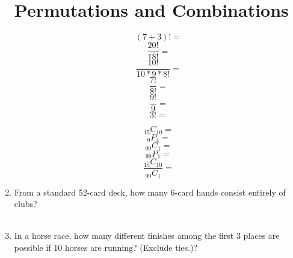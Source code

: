 \documentclass[14pt]{extarticle}
\begin{document}
\begin{enumerate}
\section{Permutations and Combinations}
	\begin{multicols}{3}
		$$(7+3)!=$$
		\vspace{0.5cm}
		$$\frac{20!}{18!}=$$
		\vspace{0.5cm}
		$$\frac{10!}{10*9*8!}=$$
		\vspace{0.5cm}
		$$\frac{7!}{8!}=$$
		\vspace{0.5cm}
		$$\frac{9!}{9}=$$
		\vspace{0.5cm}
		$$3!=$$
		\vspace{0.5cm}
	\end{multicols}
	\vspace{0.5cm}
	\begin{multicols}{3}
		$$_{15}C_{10}=$$
		\vspace{0.5cm}
		$$_9P_4=$$
		\vspace{0.5cm}
		$$_{99}C_1=$$
		\vspace{0.5cm}
		$$_{99}P_1=$$
		\vspace{0.5cm}
		$$\frac{_{15}C_{10}}{_{99}C_1}=$$
		\vspace{0.5cm}
	\end{multicols}
	\vspace{2cm}
	\item From a standard 52-card deck, how many 6-card hands consist entirely of clubs?
	\vspace{2cm}
	\\\\
	\item In a horse race, how many different finishes among the first 3 places are possible if 10 horses are running? (Exclude ties.)?
	\vspace{2cm}
\end{enumerate}

\cleardoublepage
\end{document}
